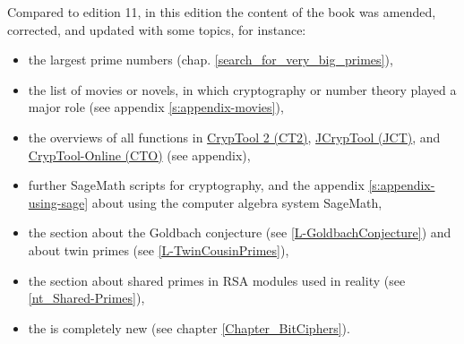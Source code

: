 Compared to edition 11, in this edition
the content of the book was amended, corrected, and
updated with some topics, for instance:
\vspace{-5pt}
\begin{itemize}
  \item the largest prime numbers (chap. \ref{search_for_very_big_primes}),
  \item the list of movies or novels, in which cryptography or number theory 
        played a major role (see appendix \ref{s:appendix-movies}),
  \item the overviews of all functions in
        \hyperlink{appendix-template-overview-CT2}{CrypTool 2 (CT2)},
        \hyperlink{appendix-function-overview-JCT}{JCrypTool (JCT)}, and
        \hyperlink{appendix-function-overview-CTO}{CrypTool-Online (CTO)}
        (see appendix),
  \item further SageMath scripts for cryptography, and the appendix
        \ref{s:appendix-using-sage} about using the computer algebra system
        SageMath,
  \item the section about the Goldbach conjecture
        (see \ref{L-GoldbachConjecture}) and about twin primes
        (see \ref{L-TwinCousinPrimes}),
  \item the section about shared primes in RSA modules used in reality
        (see \ref{nt_Shared-Primes}),
  \item the  is completely new
        (see chapter \ref{Chapter_BitCiphers}).
\end{itemize}

